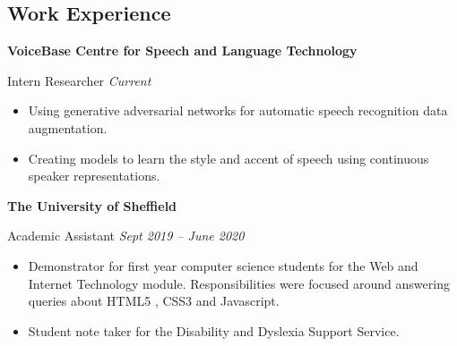 \documentclass[10pt]{article} %
\begin{document}
\begin{changemargin}{0pt}{0.5pt} %

\begin{minipage}[t]{0.5\textwidth} %
\vspace{0pt} %


\section{Work Experience}

\begin{changemargin}{5pt}{5pt}

\textbf{VoiceBase Centre for Speech and Language Technology}\\
\par
\vspace{-10pt}
Intern Researcher \hfill \textit{Current}\\
\vspace{-5pt}

\begin{itemize} \itemsep-2pt %
  \item Using generative adversarial networks for automatic speech recognition data augmentation.
  \item Creating models to learn the style and accent of speech using continuous speaker representations.
\end{itemize}


\textbf{The University of Sheffield}\\
\par
\vspace{-10pt}
Academic Assistant \hfill \textit{Sept 2019 -- June 2020}\\
\vspace{-5pt}

\begin{itemize} \itemsep-2pt %
  \item Demonstrator for first year computer science students for the Web and Internet Technology module. Responsibilities were focused around answering queries about HTML5 , CSS3 and Javascript.
  \item Student note taker for the Disability and Dyslexia Support Service.
\end{itemize}


\end{changemargin}
\end{minipage}
\end{changemargin}
\end{document}
